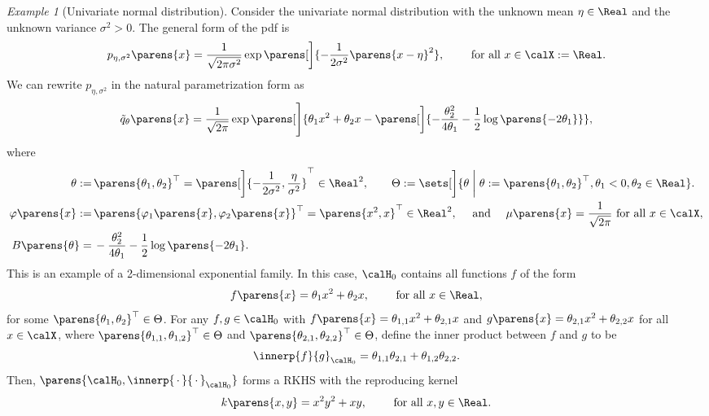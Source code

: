 \documentclass[12pt]{article}
\theoremstyle{definition}
\theoremstyle{theorem}
\theoremstyle{remark}
\newtheorem{example}{Example}
\begin{document}

\begin{example}[Univariate normal distribution]
	Consider the univariate normal distribution with the unknown mean $\eta \in \Real$ and the unknown variance $\sigma^2 > 0$. The general form of the pdf is 
	\begin{align*}
		p_{\eta, \sigma^2} \parens{x} = \frac{1}{\sqrt{2 \pi \sigma^2}} \exp \parens[\bigg]{- \frac{1}{2\sigma^2} \parens{x - \eta}^2}, \qquad \text{ for all } x \in \calX := \Real. 
	\end{align*}
	We can rewrite $p_{\eta, \sigma^2}$ in the natural parametrization form as 
	\begin{align*}
		\tilde{q}_{\theta} \parens{x} = \frac{1}{\sqrt{2\pi}} \exp \parens[\Bigg]{\theta_1 x^2 + \theta_2 x - \parens[\bigg]{ - \frac{\theta_2^2}{4\theta_1} - \frac{1}{2} \log \parens{-2\theta_1}}}, 
	\end{align*}
	where 
	\begin{align*}
		\theta := & \, \parens{\theta_1, \theta_2}^\top = \parens[\bigg]{-\frac{1}{2\sigma^2}, \frac{\eta}{\sigma^2}}^\top \in \Real^2, \qquad \Theta := \sets[\bigg]{\theta \biggm| \theta := \parens{\theta_1, \theta_2}^\top, \theta_1 < 0, \theta_2 \in \Real}. \\ 
		\varphi \parens{x} := & \, \parens{\varphi_1 \parens{x}, \varphi_2 \parens{x}}^\top = \parens{x^2, x}^\top \in \Real^2, \quad \text{ and } \quad
		\mu \parens{x} = \frac{1}{\sqrt{2\pi}} \text{ for all } x \in \calX, \\ 
		B \parens{\theta} = & \, - \frac{\theta_2^2}{4\theta_1} - \frac{1}{2} \log \parens{-2\theta_1}. 
		\end{align*}
	This is an example of a 2-dimensional exponential family. 
	In this case, $\calH_0$ contains all functions $f$ of the form 
	\begin{align*}
		f \parens{x} = \theta_1 x^2 + \theta_2 x, \qquad \text{ for all } x \in \Real, 
	\end{align*}
	for some $\parens{\theta_1, \theta_2}^\top \in \Theta$. For any $f, g \in \calH_0$ with $f \parens{x} = \theta_{1,1} x^2 + \theta_{2, 1} x$ and $g \parens{x} = \theta_{2, 1} x^2 + \theta_{2, 2} x$ for all $x \in \calX$, where $\parens{\theta_{1,1}, \theta_{1,2}}^\top \in \Theta$ and $\parens{\theta_{2,1}, \theta_{2,2}}^\top \in \Theta$, define the inner product between $f$ and $g$ to be 
	\begin{align*}
		\innerp{f}{g}_{\calH_0} = \theta_{1,1} \theta_{2,1} + \theta_{1,2} \theta_{2,2}. 
	\end{align*}
	Then, $\parens{\calH_0, \innerp{\,\cdot\,}{\,\cdot\,}_{\calH_0}}$ forms a RKHS with the reproducing kernel 
	\begin{align*}
		k \parens{x, y} = x^2 y^2 + x y, \qquad \text{ for all } x, y \in \Real. 
	\end{align*}
	

\end{example}
\end{document}
